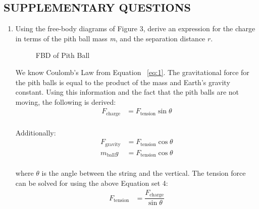 \documentclass [12pt, letterpaper, twoside]{article}
\begin{document}
\subsection*{SUPPLEMENTARY QUESTIONS}
\begin{enumerate}
  \item{Using the free-body diagrams of Figure 3, derive an expression for the charge in terms of the pith ball mass \emph{m}, and the separation distance \(r\).}

    \begin{figure}
      \centering
      \caption{FBD of Pith Ball}
      \label{fig:8}
    \end{figure}

    We know Coulomb's Law from Equation ~\ref{eq:1}. The gravitational force for the pith balls is equal to the product of the mass and Earth's gravity constant. Using this information and the fact that the pith balls are not moving, the following is derived:
    \begin{equation*}
      \begin{split}
        F_{\text{charge}} &= F_{\text{tension}}\sin{\theta} \\
      \end{split}
    \end{equation*}

    \noindent
    Additionally:
    \begin{equation}
      \begin{split}
        F_{\text{gravity}} &= F_{\text{tension}}\cos{\theta} \\
        m_{\text{ball}}g &= F_{\text{tension}}\cos{\theta} \\
      \end{split}
    \end{equation}

    \noindent
    where \(\theta\) is the angle between the string and the vertical. The tension force can be solved for using the above Equation set 4:
    \begin{equation}
      \begin{split}
        F_{\text{tension}} &= \dfrac{F_{\text{charge}}}{\sin{\theta}} \\
      \end{split}
    \end{equation}


\end{enumerate}
\end{document}
